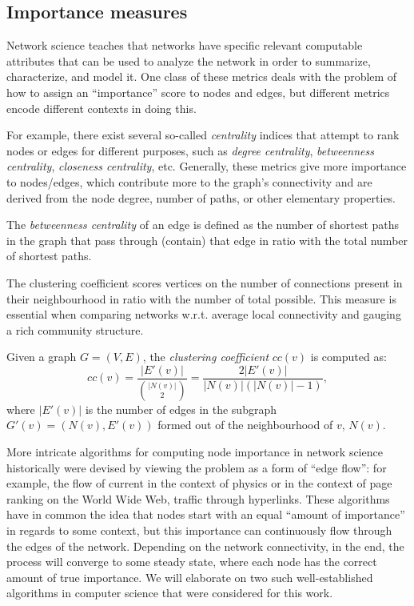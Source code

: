 \subsection{Importance measures}

Network science teaches that networks have specific relevant computable attributes that can be used to analyze the network in order to summarize, characterize, and model it. One class of these metrics deals with the problem of how to assign an \enquote{importance} score to nodes and edges, but different metrics encode different contexts in doing this.

For example, there exist several so-called \emph{centrality} indices that attempt to rank nodes or edges for different purposes, such as \emph{degree centrality}, \emph{betweenness centrality}, \emph{closeness centrality}, etc. Generally, these metrics give more importance to nodes/edges, which contribute more to the graph's connectivity and are derived from the node degree, number of paths, or other elementary properties.

\begin{definition}
The \emph{betweenness centrality} of an edge is defined as the number of shortest paths in the graph that pass through (contain) that edge in ratio with the total number of shortest paths.
\end{definition}

The clustering coefficient scores vertices on the number of connections present in their neighbourhood in ratio with the number of total possible. This measure is essential when comparing networks w.r.t. average local connectivity and gauging a rich community structure.

\begin{definition}
Given a graph $G=(V, E)$, the \emph{clustering coefficient} $cc(v)$ is computed as: \begin{equation}
cc(v)=\frac{|E'(v)|}{{|N(v)| \choose 2}} = \frac{2|E'(v)|}{|N(v)|(|N(v)|-1)},\end{equation}
where $|E'(v)|$ is the number of edges in the subgraph $G'(v)=(N(v), E'(v))$ formed out of the neighbourhood of $v$, $N(v)$.
\end{definition}

More intricate algorithms for computing node importance in network science historically were devised by viewing the problem as a form of \enquote{edge flow}: for example, the flow of current in the context of physics or in the context of page ranking on the World Wide Web, traffic through hyperlinks. These algorithms have in common the idea that nodes start with an equal \enquote{amount of importance} in regards to some context, but this importance can continuously flow through the edges of the network. Depending on the network connectivity, in the end, the process will converge to some steady state, where each node has the correct amount of true importance. We will elaborate on two such well-established algorithms in computer science that were considered for this work.

